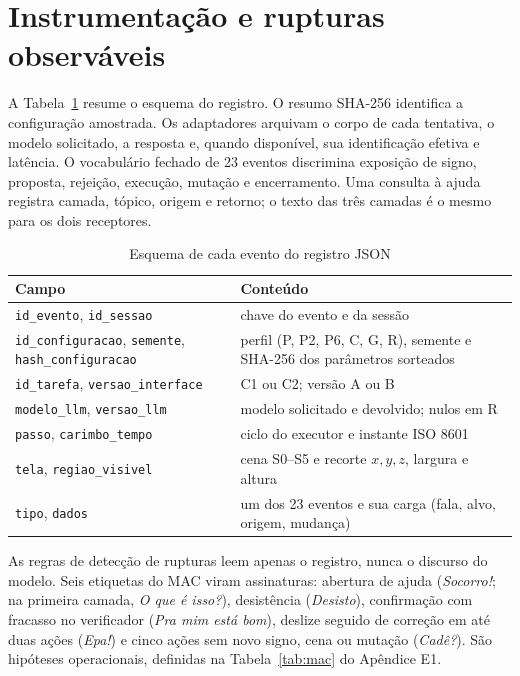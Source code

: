 \section{Instrumentação e rupturas observáveis}
A Tabela~\ref{tab:log} resume o esquema do registro. O resumo SHA-256 identifica a configuração amostrada. Os adaptadores arquivam o corpo de cada tentativa, o modelo solicitado, a resposta e, quando disponível, sua identificação efetiva e latência. O vocabulário fechado de 23 eventos discrimina exposição de signo, proposta, rejeição, execução, mutação e encerramento. Uma consulta à ajuda registra camada, tópico, origem e retorno; o texto das três camadas é o mesmo para os dois receptores.
\begin{table}[ht]
\caption{Esquema de cada evento do registro JSON}
\label{tab:log}\centering\footnotesize\setlength{\tabcolsep}{3pt}
\begin{tabularx}{\columnwidth}{@{}>{\raggedright\arraybackslash}p{}>{\raggedright\arraybackslash}X@{}}
\hline Campo & Conteúdo\\ \hline
\texttt{id\_evento}, \texttt{id\_sessao} & chave do evento e da sessão\\
\texttt{id\_configuracao}, \texttt{semente}, \texttt{hash\_configuracao} & perfil (P, P2, P6, C, G, R), semente e SHA-256 dos parâmetros sorteados\\
\texttt{id\_tarefa}, \texttt{versao\_interface} & C1 ou C2; versão A ou B\\
\texttt{modelo\_llm}, \texttt{versao\_llm} & modelo solicitado e devolvido; nulos em R\\
\texttt{passo}, \texttt{carimbo\_tempo} & ciclo do executor e instante ISO 8601\\
\texttt{tela}, \texttt{regiao\_visivel} & cena S0--S5 e recorte $x,y,z$, largura e altura\\
\texttt{tipo}, \texttt{dados} & um dos 23 eventos e sua carga (fala, alvo, origem, mudança)\\ \hline
\end{tabularx}
\end{table}

As regras de detecção de rupturas leem apenas o registro, nunca o discurso do modelo. Seis etiquetas do MAC \cite{mac} viram assinaturas: abertura de ajuda (\emph{Socorro!}; na primeira camada, \emph{O que é isso?}), desistência (\emph{Desisto}), confirmação com fracasso no verificador (\emph{Pra mim está bom}), deslize seguido de correção em até duas ações (\emph{Epa!}) e cinco ações sem novo signo, cena ou mutação (\emph{Cadê?}). São hipóteses operacionais, definidas na Tabela~\ref{tab:mac} do Apêndice E1.

